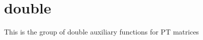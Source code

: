 \hypertarget{group__doublePTauxiliary}{}\section{double}
\label{group__doublePTauxiliary}
This is the group of double auxiliary functions for P\+T matrices 